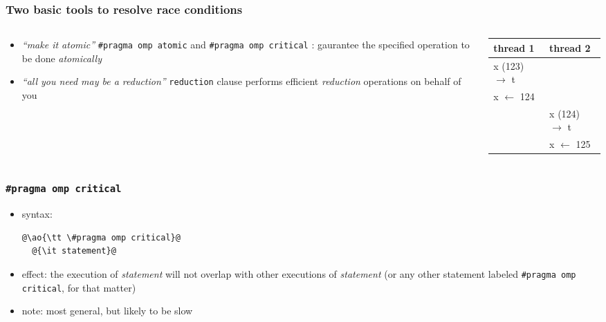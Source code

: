 \documentclass[12pt,dvipdfmx]{beamer}
\newcommand{\mura}[1]{{\color{purple}#1}}
\newcommand{\ao}[1]{{\color{blue}#1}}
\begin{document}
\begin{frame}
  \frametitle{Two basic tools to resolve race conditions}

  \begin{columns}
    \begin{column}{0.5\textwidth}
\begin{itemize}
\item \mura{\it ``make it atomic''}
  \ao{\tt \#pragma omp atomic} and \ao{\tt \#pragma omp critical} :
  gaurantee the specified operation to be done {\it atomically}

\item \mura{\it ``all you need may be a reduction''}
  \ao{\tt reduction} clause performs efficient {\it reduction}
  operations on behalf of you
\end{itemize}
    \end{column}
    
    \begin{column}{0.5\textwidth}
      \begin{center}{\footnotesize
        \begin{tabular}{|l|l|}
          thread 1                & thread 2                \\\hline
          x (123) $\rightarrow$ t &                         \\
          x $\leftarrow$ 124      &                         \\\hline
                                  & x (124) $\rightarrow$ t \\
                                  & x $\leftarrow$ 125      \\
        \end{tabular}}
      \end{center}
      \begin{center}
\def\svgwidth{0.5\textwidth}
{\scriptsize }
\end{center}
\end{column}
\end{columns}
\end{frame}


\begin{frame}[fragile]
\frametitle{{\tt \#pragma omp critical}}
\begin{itemize}
\item \ao{syntax:}
\begin{lstlisting}
@\ao{\tt \#pragma omp critical}@
  @{\it statement}@
\end{lstlisting}
\item \ao{effect:} the execution of {\it statement} will not overlap
  with other executions of {\it statement} (or any other statement
  labeled {\tt \#pragma omp critical}, for that matter)
\item note: most general, but likely to be slow
\end{itemize}
\end{frame}
\end{document}
